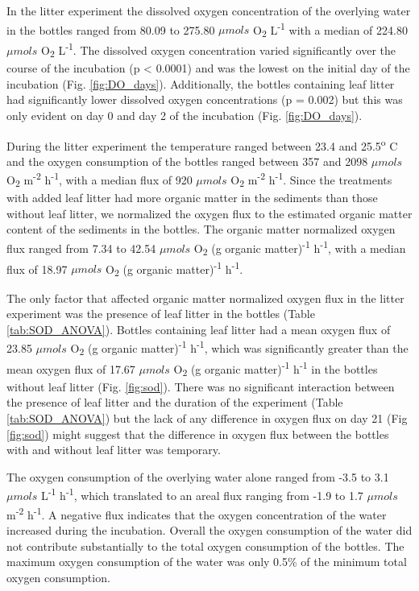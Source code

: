 In the litter experiment the dissolved oxygen concentration of the overlying water in the bottles ranged from 80.09 to 275.80 $\mu mols$ O\textsubscript{2} L\textsuperscript{-1} with a median of 224.80 $\mu mols$ O\textsubscript{2} L\textsuperscript{-1}.  The dissolved oxygen concentration varied significantly over the course of the incubation (p < 0.0001) and was the lowest on the initial day of the incubation (Fig. \ref{fig:DO_days}). Additionally, the bottles containing leaf litter had significantly lower dissolved oxygen concentrations (p = 0.002) but this was only evident on day 0 and day 2 of the incubation (Fig. \ref{fig:DO_days}).

During the litter experiment the temperature ranged between 23.4 and 25.5\textsuperscript{o} C and the oxygen consumption of the bottles ranged between 357 and 2098 $\mu mols$ O\textsubscript{2} m\textsuperscript{-2} h\textsuperscript{-1}, with a median flux of 920 $\mu mols$ O\textsubscript{2} m\textsuperscript{-2} h\textsuperscript{-1}. Since the treatments with added leaf litter had more organic matter in the sediments than those without leaf litter, we normalized the oxygen flux to the estimated organic matter content of the sediments in the bottles. The organic matter normalized oxygen flux ranged from 7.34 to 42.54 $\mu mols$ O\textsubscript{2} (g organic matter)\textsuperscript{-1} h\textsuperscript{-1}, with a median flux of 18.97 $\mu mols$ O\textsubscript{2} (g organic matter)\textsuperscript{-1} h\textsuperscript{-1}.

The only factor that affected organic matter normalized oxygen flux in the litter experiment was the presence of leaf litter in the bottles (Table \ref{tab:SOD_ANOVA}). Bottles containing leaf litter had a mean oxygen flux of 23.85 $\mu mols$ O\textsubscript{2} (g organic matter)\textsuperscript{-1} h\textsuperscript{-1}, which was significantly greater than the mean oxygen flux of 17.67 $\mu mols$ O\textsubscript{2} (g organic matter)\textsuperscript{-1} h\textsuperscript{-1} in the bottles without leaf litter (Fig. \ref{fig:sod}). There was no significant interaction between the presence of leaf litter and the duration of the experiment (Table \ref{tab:SOD_ANOVA}) but the lack of any difference in oxygen flux on day 21 (Fig \ref{fig:sod}) might suggest that the difference in oxygen flux between the bottles with and without leaf litter was temporary. 

The oxygen consumption of the overlying water alone ranged from -3.5 to 3.1 $\mu mols$ L\textsuperscript{-1} h\textsuperscript{-1}, which translated to an areal flux ranging from -1.9 to 1.7 $\mu mols$ m\textsuperscript{-2} h\textsuperscript{-1}. A negative flux indicates that the oxygen concentration of the water increased during the incubation. Overall the oxygen consumption of the water did not contribute substantially to the total oxygen consumption of the bottles. The maximum oxygen consumption of the water was only 0.5\% of the minimum total oxygen consumption.  




    